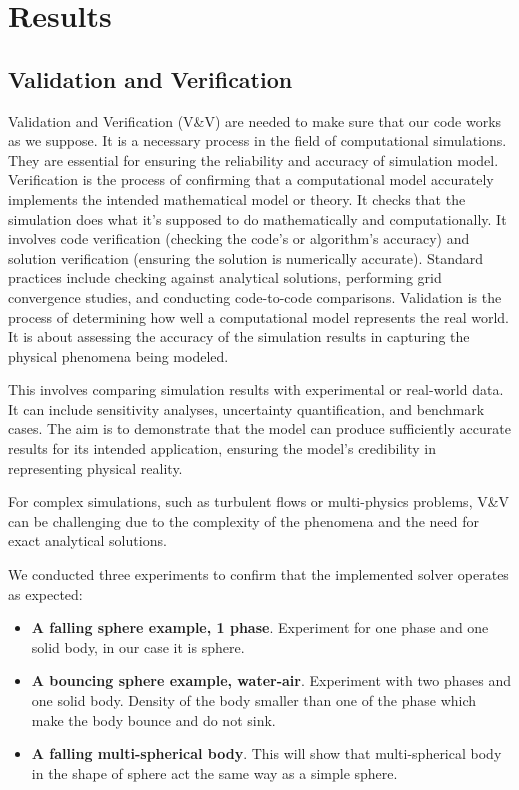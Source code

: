 \chapter{Results} \label{chap:results}
\section{Validation and Verification}
Validation and Verification (V\&V) are needed to make sure that our code works as we suppose. It is a necessary process in the field of computational simulations. They are essential for ensuring the reliability and accuracy of simulation model. Verification is the process of confirming that a computational model accurately implements the intended mathematical model or theory. It checks that the simulation does what it's supposed to do mathematically and computationally.
It involves code verification (checking the code's or algorithm's accuracy) and solution verification (ensuring the solution is numerically accurate). Standard practices include checking against analytical solutions, performing grid convergence studies, and conducting code-to-code comparisons.
Validation is the process of determining how well a computational model represents the real world. It is about assessing the accuracy of the simulation results in capturing the physical phenomena being modeled.

This involves comparing simulation results with experimental or real-world data. It can include sensitivity analyses, uncertainty quantification, and benchmark cases. The aim is to demonstrate that the model can produce sufficiently accurate results for its intended application, ensuring the model's credibility in representing physical reality.

For complex simulations, such as turbulent flows or multi-physics problems, V\&V can be challenging due to the complexity of the phenomena and the need for exact analytical solutions.

We conducted three experiments to confirm that the implemented solver operates as expected:
\begin{itemize}
    \item \textbf{A falling sphere example, 1 phase}. Experiment for one phase and one solid body, in our case it is sphere. 
    \item \textbf{A bouncing sphere example, water-air}. Experiment with two phases and one solid body. Density of the body smaller than one of the phase which make the body bounce and do not sink.
    \item \textbf{A falling multi-spherical body}. This will show that multi-spherical body in the shape of sphere act the same way as a simple sphere.
\end{itemize}

